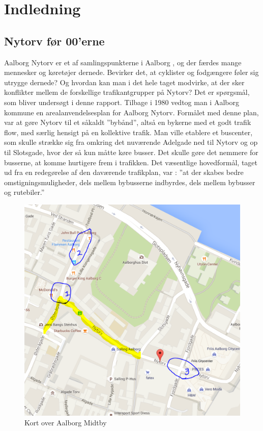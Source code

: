 \chapter{Indledning}
\label{chap:Indledning}

\section{Nytorv før 00'erne}
\label{sec:nytorv_foer_null}
Aalborg Nytorv er et af samlingspunkterne i Aalborg , og der færdes mange mennesker og køretøjer dernede. Bevirker det, at cyklister og fodgængere føler sig utrygge dernede? Og hvordan kan man i det hele taget modvirke, at der sker konflikter mellem de forskellige trafikantgrupper på Nytorv? Det er spørgsmål, som bliver undersøgt i denne rapport.
Tilbage i 1980 vedtog man i Aalborg kommune en arealanvendelsesplan for Aalborg Nytorv.
Formålet med denne plan, var at gøre Nytorv til et såkaldt ”bybånd”, altså en bykerne med et godt trafik flow, med særlig hensigt på en kollektive trafik. Man ville etablere et buscenter, som skulle strække sig fra omkring det nuværende Adelgade ned til Nytorv og op til Slotsgade, hvor der så kun måtte køre busser. Det skulle gøre det nemmere for busserne, at komme hurtigere frem i trafikken. Det  væsentlige hovedformål, taget ud fra en redegørelse af den daværende trafikplan, var :
”at der skabes bedre omstigningsmuligheder, dels mellem bybusserne     indbyrdes, dels mellem bybusser og rutebiler.”
\begin{figure}
\centering
\includegraphics[scale=0.5]{opserveringspunkter2.PNG}
\caption{Kort over Aalborg Midtby}
\end{figure}
